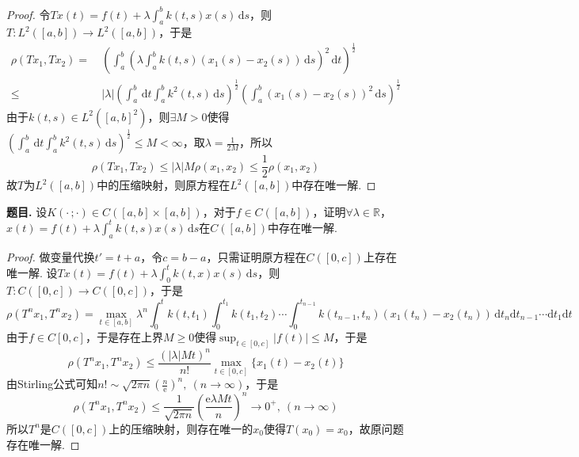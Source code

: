 \documentclass[12pt, a4paper, oneside]{ctexart}
\newcounter{problem}  %
\newenvironment{problem}[1][]{\stepcounter{problem}\par\noindent\textbf{题目\arabic{problem}. #1}}{\smallskip\par}
\let\leq=\leqslant %
\let\geq=\geqslant %
\def\R{\mathbb{R}}          %
\def\d{\mathrm{d}}          %
\def\e{\mathrm{e}}          %
\def\add{\vspace{1ex}}      %
\begin{document}
\begin{proof}
    令$Tx(t) = f(t)+\lambda \int_a^b k(t, s)x(s)\,\d s$，则$T:L^2([a,b])\to L^2([a,b])$，于是 
    \begin{align*}
        \rho(Tx_1,Tx_2)=&\ \left(\int_a^b\left(\lambda\int_a^bk(t,s)(x_1(s)-x_2(s))\,\d s\right)^2\,\d t\right)^{\frac{1}{2}}\\
        \leq&\ |\lambda|\left(\int_a^b\,\d t\int_a^bk^2(t,s)\,\d s\right)^{\frac{1}{2}}\left(\int_a^b(x_1(s)-x_2(s))^2\,\d s\right)^{\frac{1}{2}}
    \end{align*}
    由于$k(t,s)\in L^2([a,b]^2)$，则$\exists M > 0$使得$\left(\int_a^b\,\d t\int_a^bk^2(t,s)\,\d s\right)^{\frac{1}{2}}\leq M < \infty$，取$\lambda = \frac{1}{2M}$，所以
    \begin{equation*}
        \rho(Tx_1,Tx_2)\leq |\lambda|M\rho(x_1,x_2)\leq \frac{1}{2}\rho(x_1,x_2)
    \end{equation*}
    故$T$为$L^2([a,b])$中的压缩映射，则原方程在$L^2([a,b])$中存在唯一解.
\end{proof}
\begin{problem}
    设$K(\cdot\, ;\cdot )\in C([a,b]\times [a,b])$，对于$f\in C([a,b])$，证明$\forall \lambda \in \R$，\add\\
    $x(t)= f(t)+\lambda\int_a^t k(t,s)x(s)\,\d s$在$C([a,b])$中存在唯一解.
\end{problem}
\begin{proof}
    做变量代换$t'=t+a$，令$c=b-a$，只需证明原方程在$C([0,c])$上存在唯一解. 设$Tx(t) = f(t)+\lambda \int_0^t k(t,x)x(s)\,\d s$，则$T:C([0,c])\to C([0,c])$，于是
    \begin{equation*}
        \rho(T^nx_1,T^nx_2) = \max_{t\in[a,b]}\lambda^n\int_0^tk(t,t_1)\int_0^{t_1}k(t_1,t_2)\cdots\int_0^{t_{n-1}}k(t_{n-1}, t_n)(x_1(t_n) - x_2(t_n))\,\d t_n\d t_{n-1}\cdots\d t_1\d t
    \end{equation*}
    由于$f\in C[0,c]$，于是存在上界$M\geq 0$使得$\sup_{t\in[0,c]}|f(t)|\leq M$，于是
    \begin{equation*}
        \rho(T^nx_1,T^nx_2)\leq \frac{(|\lambda|Mt)^n}{n!}\max_{t\in[0,c]}\{x_1(t)-x_2(t)\}
    \end{equation*}
    由Stirling公式可知$n!\sim \sqrt{2\pi n}\left(\frac{n}{\e}\right)^n,\ (n\to\infty)$，于是
    \begin{equation*}
        \rho(T^nx_1,T^nx_2)\leq \frac{1}{\sqrt{2\pi n}}\left(\frac{\e \lambda M t}{n}\right)^n\to 0^+,\ (n\to\infty)
    \end{equation*}
    所以$T^n$是$C([0,c])$上的压缩映射，则存在唯一的$x_0$使得$T(x_0)=x_0$，故原问题存在唯一解.
\end{proof}
\end{document}
